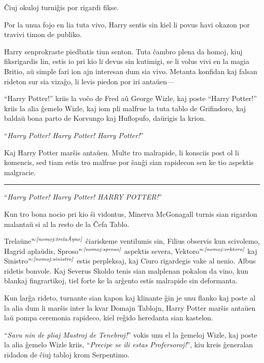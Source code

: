 Ĉiuj okuloj turniĝis por rigardi fikse.

Por la unua fojo en lia tuta vivo, Harry sentis sin kiel li povus havi
okazon por travivi timon de publiko.

Harry senprokraste piedbatis tiun senton. Tuta ĉambro plena da homoj,
kiuj fiksrigardis lin, estis io pri kio li devus sin kutimigi, se li
volus vivi en la magia Britio, aŭ simple fari ion ajn interesan dum
sia vivo. Metanta konfidan kaj falsan rideton sur sia vizaĝo, li levis
piedon por iri antaŭen—

``Harry Potter!'' kriis la voĉo de Fred aû George Wizle, kaj poste
``Harry Potter!'' kriis la alia ĝemelo Wizle, kaj iom pli malfrue la
tuta tablo de Grifindoro, kaj baldaŭ bona parto de Korvungo kaj
Huflopufo, daŭrigis la krion.

``\emph{Harry Potter! Harry Potter! Harry Potter!}''

Kaj Harry Potter marŝis antaŭen. Multe tro malrapide, li konsciis post
ol li komencis, sed tiam estis tro malfrue por ŝanĝi sian rapidecon
sen ke tio aspektis malgracie.

\begin{center}\rule{3in}{0.4pt}\end{center}

``\emph{Harry Potter! Harry Potter! HARRY POTTER!}'' 

Kun tro bona nocio pri kio ŝi vidontus, Minerva McGonagall turnis sian
rigardon malantaŭ si al la resto de la Ĉefa Tablo.

Trelaŭne$^{\textit{n:\ref{nomoj:trelaŭne}}}$ ĉiariskeme ventilumis sin, Filius
observis kun scivolemo, Hagrid aplaŭdis, Sproso$^{\textit{n:\ref{nomoj:sproso}}}$
aspektis severa, Vektoro$^{\textit{n:\ref{nomoj:vektoro}}}$ kaj
Sinistro$^{\textit{n:\ref{nomoj:sinistro}}}$ estis perpleksaj, kaj Ciuro rigardegis
vake al nenio. Albus ridetis bonvole. Kaj Severus Skoldo tenis sian
malplenan pokalon da vino, kun blankaj fingrartikoj, tiel forte ke la
arĝento estis malrapide sin deformanta.

Kun larĝa rideto, turnante sian kapon kaj klinante ĝin je unu flanko
kaj poste al la alia dum li marŝis inter la kvar Domajn Tablojn, Harry
Potter marŝis antaŭen laŭ pompa ceremonia rapideco, kiel reĝido
heredanta sian kastelon.

``\emph{Savu nin de pliaj Mastroj de Tenebroj!}'' vokis unu el la
ĝemeloj Wizle, kaj poste la alia ĝemelo Wizle kriis, ``\emph{Precipe
  se ili estas Profersoroj!}'', kiu kreis ĝeneralan ridadon de ĉiuj
tabloj krom Serpentimo.

